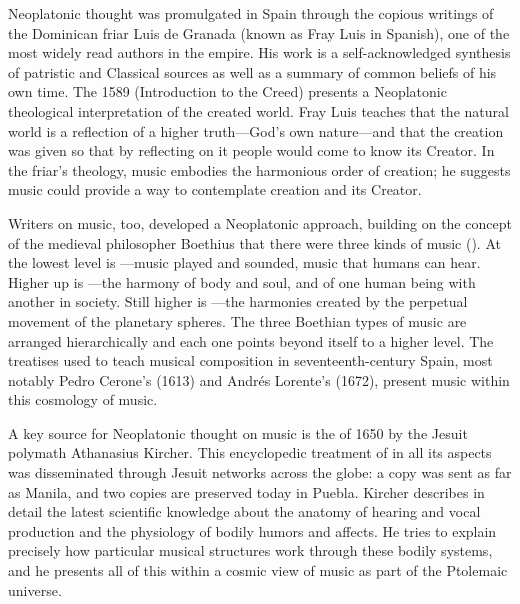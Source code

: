 
Neoplatonic thought was promulgated in Spain through the copious writings of
the Dominican friar Luis de Granada (known as Fray Luis in Spanish), one of the
most widely read authors in the empire.%
    \Autocite{Weber:ReligiousLitSpain}
His work is a self-acknowledged synthesis of patristic and Classical
sources as well as a summary of common beliefs of his own time.
The 1589  (Introduction to the Creed)
presents a Neoplatonic theological interpretation of the created world.%
    \Autocites
    {LuisdeGranada-Balcells:SimboloPtI}
    {LuisdeGranada:Simbolo}
Fray Luis teaches that the natural world is a reflection of a higher
truth---God's own nature---and that the creation was given so that by
reflecting on it people would come to know its Creator.
In the friar's theology, music embodies the harmonious order of creation; he
suggests music could provide a way to contemplate creation and its
Creator.


Writers on music, too, developed a Neoplatonic approach, building on the
concept of the medieval philosopher Boethius that there were three kinds of
music ().%
    \Autocite{Boethius:Musica}
At the lowest level is ---music played and sounded,
music that humans can hear.
Higher up is ---the harmony of body and soul, and of one
human being with another in society.
Still higher is ---the harmonies created by the perpetual
movement of the planetary spheres.
The three Boethian types of music are arranged hierarchically and each one
points beyond itself to a higher level.
The treatises used to teach musical composition in seventeenth-century Spain,
most notably Pedro Cerone's  (1613) and Andrés
Lorente's  (1672), present music within this
cosmology of music.


A key source for Neoplatonic thought on music is the  of 1650 by the Jesuit polymath Athanasius Kircher.%
\Autocite{Kircher:Musurgia}
This encyclopedic treatment of  in all its aspects
was disseminated through Jesuit networks across the globe: a copy was sent as
far as Manila, and two copies are preserved today in Puebla.%
    \Autocites
    {Findlen:Kircher}
    {Godwin:KircherTheater}
    [48--50]{Irving:Colonial}
Kircher describes in detail the latest scientific knowledge about the anatomy
of hearing and vocal production and the physiology of bodily humors and
affects. 
He tries to explain precisely how particular musical structures
work through these bodily systems, and he presents all of this within a cosmic
view of music as part of the Ptolemaic universe.


